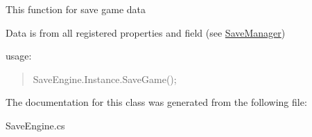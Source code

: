 \begin{DoxyItemize}
\item This function for save game data
\item Data is from all registered properties and field (see \mbox{\hyperlink{class_save_manager}{Save\+Manager}})
\end{DoxyItemize}

usage\+: \begin{quote}
Save\+Engine.\+Instance.\+Save\+Game();\end{quote}


The documentation for this class was generated from the following file\+:\begin{DoxyCompactItemize}
\item 
Save\+Engine.\+cs\end{DoxyCompactItemize}
